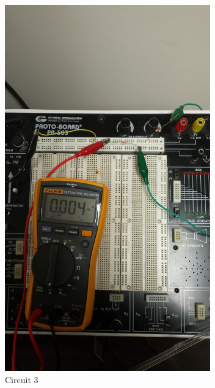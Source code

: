 \documentclass[12pt]{article}
\begin{document}
\begin{figure}[h!] %
   \centering
   \includegraphics[width=3.5in,angle=-90]{Circuit_3_real.jpg} 
   \caption{Circuit 3}
   \label{fig:example}
\end{figure}

\newpage
\end{document}
